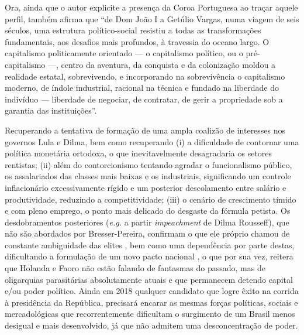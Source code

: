 	Ora, ainda que o autor explicite a presença da Coroa Portuguesa ao traçar aquele perfil,  também afirma que ``de Dom João I a Getúlio Vargas, numa viagem de seis séculos, uma estrutura político-social resistiu a todas as transformações fundamentais, aos desafios mais profundos, à travessia do oceano largo. O capitalismo politicamente orientado --- o capitalismo político, ou o pré-capitalismo ---, centro da aventura, da conquista e da colonização moldou a realidade estatal, sobrevivendo, e incorporando na sobrevivência o capitalismo moderno, de índole industrial, racional na técnica e fundado na liberdade do indivíduo — liberdade de negociar, de contratar, de gerir a propriedade sob a garantia das instituições''.
	
	Recuperando a tentativa de formação de uma ampla coalizão de interesses nos governos Lula e Dilma, bem como recuperando (i) a dificuldade de contornar uma política monetária ortodoxa, o que inevitavelmente desagradaria os setores rentistas; (ii) além do contorcionismo tentando agradar o funcionalismo público, os assalariados das classes mais baixas e os industriais, significando um controle inflacionário excessivamente rígido e um posterior descolamento entre salário e produtividade, reduzindo a competitividade; (iii) o cenário de crescimento tímido e com pleno emprego, o ponto mais delicado do desgaste da fórmula petista. Os desdobramentos posteriores (\textit{e.g.} a partir \textit{impeachment} de Dilma Rousseff), que não são abordados por Bresser-Pereira, confirmam o que ele próprio chamou de constante ambiguidade das elites \cite[p. 368]{Bresser2016}, bem como uma dependência por parte destas, dificultando a formulação de um novo pacto nacional \cite[p. 363]{Bresser2016}, o que por sua vez, reitera que Holanda e Faoro não estão falando de fantasmas do passado, mas de oligarquias parasitárias absolutamente atuais e que permanecem detendo capital e/ou poder político. Ainda em 2018 qualquer candidato que logre êxito na corrida à presidência da República, precisará encarar as mesmas forças políticas, sociais e mercadológicas que recorrentemente dificultam o surgimento de um Brasil menos desigual e mais desenvolvido, já que não admitem uma desconcentração de poder.
	
	
	\postextual
	
	
	
